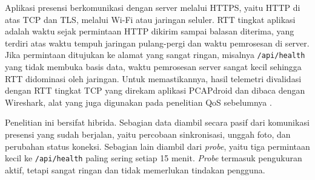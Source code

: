 Aplikasi presensi berkomunikasi dengan server melalui HTTPS, yaitu HTTP di atas TCP dan TLS, melalui Wi-Fi atau jaringan seluler. RTT tingkat aplikasi adalah waktu sejak permintaan HTTP dikirim sampai balasan diterima, yang terdiri atas waktu tempuh jaringan pulang-pergi dan waktu pemrosesan di server. Jika permintaan ditujukan ke alamat yang sangat ringan, misalnya \texttt{/api/health} yang tidak membuka basis data, waktu pemrosesan server sangat kecil sehingga RTT didominasi oleh jaringan. Untuk memastikannya, hasil telemetri divalidasi dengan RTT tingkat TCP yang direkam aplikasi PCAPdroid dan dibaca dengan Wireshark, alat yang juga digunakan pada penelitian QoS sebelumnya \parencite{rosid2023qos,fiqria2024qos}.

Penelitian ini bersifat hibrida. Sebagian data diambil secara pasif dari komunikasi presensi yang sudah berjalan, yaitu percobaan sinkronisasi, unggah foto, dan perubahan status koneksi. Sebagian lain diambil dari \textit{probe}, yaitu tiga permintaan kecil ke \texttt{/api/health} paling sering setiap 15 menit. \textit{Probe} termasuk pengukuran aktif, tetapi sangat ringan dan tidak memerlukan tindakan pengguna.

